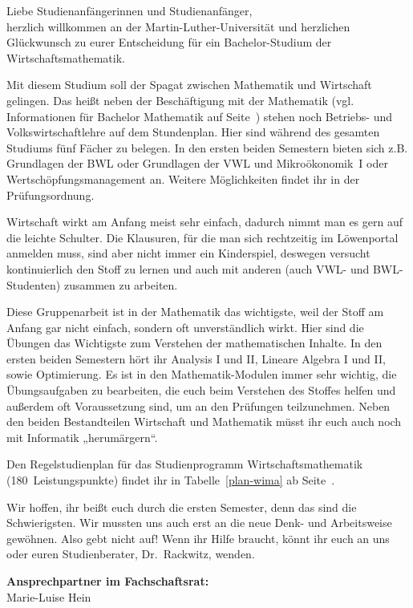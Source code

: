 Liebe Studienanfängerinnen und Studienanfänger,\\
herzlich willkommen an der Martin-Luther-Universität und herzlichen Glückwunsch zu eurer Entscheidung für ein Bachelor-Studium der Wirtschaftsmathematik.

Mit diesem Studium soll der Spagat zwischen Mathematik und Wirtschaft gelingen.
Das heißt neben der Beschäftigung mit der Mathematik (vgl. Informationen für Bachelor Mathematik auf Seite~\pageref{studiengang_mathematik}) stehen noch Betriebs- und Volkswirtschaftlehre auf dem Stundenplan.
Hier sind während des gesamten Studiums fünf Fächer zu belegen.
In den ersten beiden Semestern bieten sich z.B. Grundlagen der BWL oder Grundlagen der VWL und Mikroökonomik~I oder Wertschöpfungsmanagement an.
Weitere Möglichkeiten findet ihr in der Prüfungsordnung.

Wirtschaft wirkt am Anfang meist sehr einfach, dadurch nimmt man es gern auf die leichte Schulter.
Die Klausuren, für die man sich rechtzeitig im Löwenportal anmelden muss, sind aber nicht immer ein Kinderspiel, deswegen versucht kontinuierlich den Stoff zu lernen und auch mit anderen (auch VWL- und BWL-Studenten) zusammen zu arbeiten.

Diese Gruppenarbeit ist in der Mathematik das wichtigste, weil der Stoff am Anfang gar nicht einfach, sondern oft unverständlich wirkt.
Hier sind die Übungen das Wichtigste zum Verstehen der mathematischen Inhalte.
In den ersten beiden Semestern hört ihr Analysis I und II, Lineare Algebra I und II, sowie Optimierung.
Es ist in den Mathematik-Modulen immer sehr wichtig, die Übungsaufgaben zu bearbeiten, die euch beim Verstehen des Stoffes helfen und außerdem oft Voraussetzung sind, um an den Prüfungen teilzunehmen.
Neben den beiden Bestandteilen Wirtschaft und Mathematik müsst ihr euch auch noch mit Informatik „herumärgern“.

Den Regelstudienplan für das Studienprogramm Wirtschaftsmathematik (180~Leistungspunkte) findet ihr in Tabelle~\ref{plan-wima} ab Seite~\pageref{plan-wima}.

Wir hoffen, ihr beißt euch durch die ersten Semester, denn das sind die Schwierigsten.
Wir mussten uns auch erst an die neue Denk- und Arbeitsweise gewöhnen.
Also gebt nicht auf!
Wenn ihr Hilfe braucht, könnt ihr euch an uns oder euren Studienberater, Dr.~Rackwitz, wenden.

\textbf{Ansprechpartner im Fachschaftsrat:}\\
Marie-Luise Hein\\


